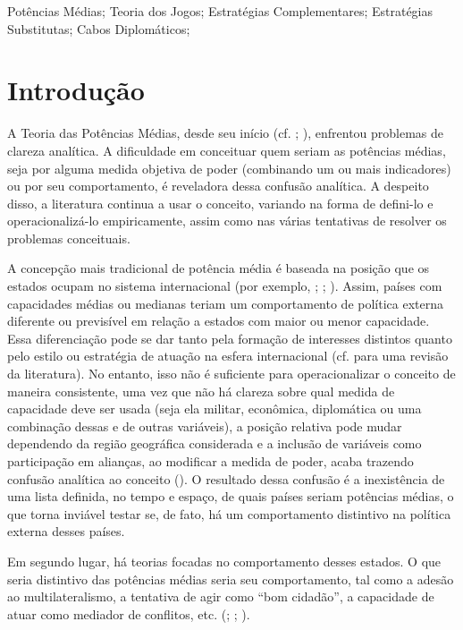 \documentclass[]{interact}
\theoremstyle{plain}%
\theoremstyle{definition}
\theoremstyle{remark}
\begin{document}
\begin{keywords}
Potências Médias; Teoria dos Jogos; Estratégias Complementares;
Estratégias Substitutas; Cabos Diplomáticos;
\end{keywords}

\hypertarget{introduuxe7uxe3o}{%
\section{Introdução}\label{introduuxe7uxe3o}}

A Teoria das Potências Médias, desde seu início (cf.
\citet{chaudhuri_1969}; \citet{holbraad_71}), enfrentou problemas de
clareza analítica. A dificuldade em conceituar quem seriam as potências
médias, seja por alguma medida objetiva de poder (combinando um ou mais
indicadores) ou por seu comportamento, é reveladora dessa confusão
analítica. A despeito disso, a literatura continua a usar o conceito,
variando na forma de defini-lo e operacionalizá-lo empiricamente, assim
como nas várias tentativas de resolver os problemas conceituais.

A concepção mais tradicional de potência média é baseada na posição que
os estados ocupam no sistema internacional (por exemplo,
\citet{holbraad_84}; \citet{cooper_etal_93}; \citet{shin_12}). Assim,
países com capacidades médias ou medianas teriam um comportamento de
política externa diferente ou previsível em relação a estados com maior
ou menor capacidade. Essa diferenciação pode se dar tanto pela formação
de interesses distintos quanto pelo estilo ou estratégia de atuação na
esfera internacional (cf. \citet{cooper_11} para uma revisão da
literatura). No entanto, isso não é suficiente para operacionalizar o
conceito de maneira consistente, uma vez que não há clareza sobre qual
medida de capacidade deve ser usada (seja ela militar, econômica,
diplomática ou uma combinação dessas e de outras variáveis), a posição
relativa pode mudar dependendo da região geográfica considerada e a
inclusão de variáveis como participação em alianças, ao modificar a
medida de poder, acaba trazendo confusão analítica ao conceito
(\citet{cooper_11}). O resultado dessa confusão é a inexistência de uma
lista definida, no tempo e espaço, de quais países seriam potências
médias, o que torna inviável testar se, de fato, há um comportamento
distintivo na política externa desses países.

Em segundo lugar, há teorias focadas no comportamento desses estados. O
que seria distintivo das potências médias seria seu comportamento, tal
como a adesão ao multilateralismo, a tentativa de agir como ``bom
cidadão'', a capacidade de atuar como mediador de conflitos, etc.
(\citet{schiavon_dominguez_16}; \citet{stephen_13}; \citet{welsh_04}).
\end{document}

